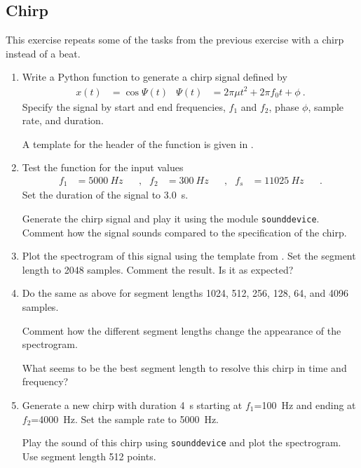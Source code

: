 \subsection{Chirp}
This exercise repeats some of the tasks from the previous exercise with a chirp instead of a beat.
\begin{enumerate}
\item Write a Python function to generate a chirp signal defined by
		\begin{align}
			x(t)&= \cos \Psi(t) & 
			\Psi(t) &= 2 \pi \mu t^2 + 2 \pi f_0 t + \phi  \:.
		\end{align}
	Specify the signal by start and end frequencies, $f_1$  and $f_2$, phase $\phi$, sample rate, and duration. 
	
	A template for the header of the function is given in .
	
	
		
\item Test the function for the input values
	\begin{align*}
		f_1&=\qty{5000}{Hz} & &, & f_2&=\qty{300}{Hz}
		& &, & f_s&=\qty{11025}{Hz} & &.
	\end{align*}
	Set the duration of the signal to \qty{3.0}{s}.
	
	Generate the chirp signal and play it using the module \verb|sounddevice|. 	
	Comment how the signal sounds compared to the specification of the chirp.
		
\item Plot the spectrogram of this signal using the template from .
	Set the segment length to \num{2048} samples.
	Comment the result. Is it as expected?	
	
\item Do the same as above for segment lengths 1024, 512, 256, 128, 64, and 4096 samples.
	
	Comment how the different segment lengths change the appearance of the spectrogram.
	
	What seems to be the best segment length to resolve this chirp in time and frequency?

\item  Generate a new chirp with duration \qty{4}{s} starting at $f_1$=\qty{100}{Hz} and ending at $f_2$=\qty{4000}{Hz}. Set the sample rate to \qty{5000}{Hz}.

	Play the sound of this chirp using \verb|sounddevice| and plot the spectrogram. Use segment length 512 points.
	

\end{enumerate}
